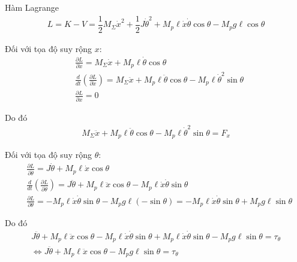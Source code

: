             Hàm Lagrange
            \begin{align}
                L = K - V = \dfrac{1}{2} M_{\Sigma} \dot{x}^2 + \dfrac{1}{2} J \dot{\theta}^2 + M_p \ell \dot{x} \dot{\theta} \cos \theta - M_p g \ell \cos \theta 
            \end{align}    

            Đối với tọa độ suy rộng $x$:
            \begin{align*}
                &\frac{\partial L}{\partial \dot{x}} = M_{\Sigma} \dot{x} + M_p \ell \dot{\theta} \cos \theta\\
                &\frac{d}{dt} \left( \frac{\partial L}{\partial \dot{x}} \right) = M_{\Sigma} \ddot{x} + M_p \ell \ddot{\theta} \cos \theta - M_p \ell \dot{\theta}^2 \sin \theta\\
                &\frac{\partial L}{\partial x} = 0
            \end{align*}

            Do đó
            \begin{align}
                M_{\Sigma} \ddot{x} + M_p \ell \ddot{\theta} \cos \theta - M_p \ell \dot{\theta}^2 \sin \theta = F_x
            \end{align}


            Đối với tọa độ suy rộng $\theta$:
            \begin{align*}
                &\frac{\partial L}{\partial \dot{\theta}} = J \dot{\theta} + M_p \ell \dot{x} \cos \theta\\
                &\frac{d}{dt} \left( \frac{\partial L}{\partial \dot{\theta}} \right) = J \ddot{\theta} + M_p \ell \ddot{x} \cos \theta - M_p \ell \dot{x} \dot{\theta} \sin \theta\\
                &\frac{\partial L}{\partial \theta} = -M_p \ell \dot{x} \dot{\theta} \sin \theta - M_p g \ell (-\sin \theta) = -M_p \ell \dot{x} \dot{\theta} \sin \theta + M_p g \ell \sin \theta
            \end{align*}

            Do đó
            \begin{align}
                J \ddot{\theta} + M_p \ell \ddot{x} \cos \theta - M_p \ell \dot{x} \dot{\theta} \sin \theta + M_p \ell \dot{x} \dot{\theta} \sin \theta - M_p g \ell \sin \theta = \tau_\theta \nonumber\\
                \Leftrightarrow J \ddot{\theta} + M_p \ell \ddot{x} \cos \theta - M_p g \ell \sin \theta = \tau_\theta
            \end{align}

